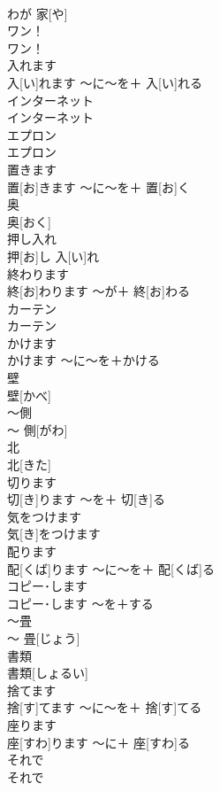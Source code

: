\documentclass[8pt]{extreport}
\begin{document}
\begin{CJK}{UTF8}{min}
\\	わが 家[や]		
\\	ワン！	
\\	ワン！		
\\	入れます	
\\	入[い]れます	〜に〜を＋ 入[い]れる	
\\	インターネット	
\\	インターネット		
\\	エプロン	
\\	エプロン		
\\	置きます	
\\	置[お]きます	〜に〜を＋ 置[お]く	
\\	奥	
\\	奥[おく]		
\\	押し入れ	
\\	押[お]し 入[い]れ		
\\	終わります	
\\	終[お]わります	〜が＋ 終[お]わる	
\\	カーテン	
\\	カーテン		
\\	かけます	
\\	かけます	〜に〜を＋かける	
\\	壁	
\\	壁[かべ]		
\\	〜側	
\\	〜 側[がわ]		
\\	北	
\\	北[きた]		
\\	切ります	
\\	切[き]ります	〜を＋ 切[き]る	
\\	気をつけます	
\\	気[き]をつけます		
\\	配ります	
\\	配[くば]ります	〜に〜を＋ 配[くば]る	
\\	コピー･します	
\\	コピー･します	〜を＋する	
\\	〜畳	
\\	〜 畳[じょう]		
\\	書類	
\\	書類[しょるい]		
\\	捨てます	
\\	捨[す]てます	〜に〜を＋ 捨[す]てる	
\\	座ります	
\\	座[すわ]ります	〜に＋ 座[すわ]る	
\\	それで	
\\	それで		

\end{CJK}
\end{document}
